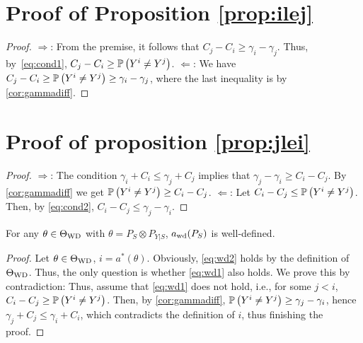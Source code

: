 \section*{Proof of Proposition \ref{prop:ilej}}
\begin{proof}
	\noindent $\Rightarrow$: From the premise, it follows that $C_j - C_i \ge \gamma_i - \gamma_j$.
	Thus, by~\eqref{eq:cond1}, $C_j - C_i \ge \mathbb{P}\left(Y^i\ne Y^j\right)$.
	\noindent $\Leftarrow$: We have $C_j - C_i \ge \mathbb{P}\left(Y^i \ne Y^j\right) \ge \gamma_i -\gamma_j$, where the last
	inequality is by \cref{cor:gammadiff}.
	\end{proof}
\section*{Proof of proposition \ref{prop:jlei}}	
	\begin{proof}
		\noindent $\Rightarrow$: The condition $\gamma_i + C_i \le \gamma_j + C_j$ implies that $\gamma_j -\gamma_i \ge C_i - C_j$.
		By \cref{cor:gammadiff} we get $\mathbb{P}\left(Y^i \ne Y^j\right) \ge C_i - C_j$.
		\noindent $\Leftarrow$: Let $C_i - C_j \le \mathbb{P}\left(Y^i \ne Y^j\right)$. Then, by \eqref{eq:cond2}, $C_i - C_j \le \gamma_j - \gamma_i$.
	\end{proof}



















	


\begin{prop}
	\label{prop:awdwelldef}
	For any $\theta \in \Theta_{\mathrm{WD}}$ with $\theta = P_S\otimes P_{Y|S}$, $a_{\mathrm{wd}}(P_S)$ is well-defined.
\end{prop}

\begin{proof}
	Let $\theta\in \Theta_{\mathrm{WD}}$, $i = a^*(\theta)$. Obviously, \eqref{eq:wd2} holds by the definition of $\Theta_{\mathrm{WD}}$.
	Thus, the only question is whether \eqref{eq:wd1} also holds.
	We prove this by contradiction:
	Thus, assume that \eqref{eq:wd1} does not hold, i.e., for some $j<i$, $C_i-C_j \ge \mathbb{P}\left(Y^i \ne Y^j\right)$. Then, by \cref{cor:gammadiff}, $\mathbb{P}\left( Y^i \ne Y^j\right) \ge \gamma_j - \gamma_i$, hence $\gamma_j + C_j \le \gamma_i + C_i$, which contradicts the definition of $i$, thus finishing the proof.
	\end{proof}


